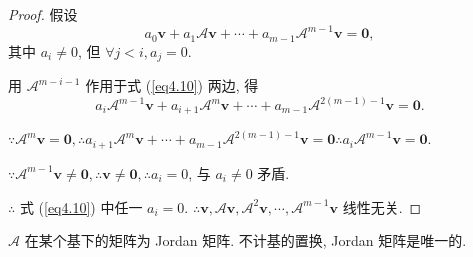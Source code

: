 \documentclass[color=black,device=normal,lang=cn,mode=geye]{elegantnote}
\begin{document}
\begin{proof}
    假设
    \begin{equation}\label{eq4.10}
        a_0\boldsymbol{v}+a_1\mathcal{A}\boldsymbol{v}+\cdots+a_{m-1}\mathcal{A}^{m-1}\boldsymbol{v}=\boldsymbol{0},
    \end{equation}
    其中 $a_i\neq0$, 但 $\forall j<i,a_j=0$.

    用 $\mathcal{A}^{m-i-1}$ 作用于式 (\ref{eq4.10}) 两边, 得
    \[a_i\mathcal{A}^{m-1}\boldsymbol{v}+a_{i+1}\mathcal{A}^m\boldsymbol{v}+\cdots+a_{m-1}\mathcal{A}^{2(m-1)-1}\boldsymbol{v}=\boldsymbol{0}.\]

    $\because\mathcal{A}^m\boldsymbol{v}=\boldsymbol{0},\therefore a_{i+1}\mathcal{A}^m\boldsymbol{v}+\cdots+a_{m-1}\mathcal{A}^{2(m-1)-1}\boldsymbol{v}=\boldsymbol{0}\therefore a_i\mathcal{A}^{m-1}\boldsymbol{v}=\boldsymbol{0}$.

    $\because\mathcal{A}^{m-1}\boldsymbol{v}\neq\boldsymbol{0},\therefore\boldsymbol{v}\neq\boldsymbol{0},\therefore a_i=0$, 与 $a_i\neq0$ 矛盾.
    
    $\therefore$ 式 (\ref{eq4.10}) 中任一 $a_i=0$. $\therefore\boldsymbol{v},\mathcal{A}\boldsymbol{v},\mathcal{A}^2\boldsymbol{v},\cdots,\mathcal{A}^{m-1}\boldsymbol{v}$ 线性无关.
\end{proof}
\begin{theorem}\label{t4.4}
    $\mathcal{A}$ 在某个基下的矩阵为 Jordan 矩阵. 不计基的置换, Jordan 矩阵是唯一的.
\end{theorem}
\end{document}
